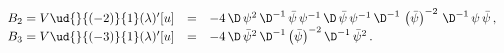 \begin{equation*}
\begin{array}{rcl}
B_2 = V\ud{}{(-2)}{1}(\lambda)'[u]& = & -4\,\D\,\psi^2\,\D^{-1}\,{\bar{\psi}}\,{\psi}^{-1}\,\D\,{\bar{\psi}}\,{\psi}^{-1}\,\D^{-1}\,\left(\bar{{\psi}}\right)^{-2}\,\D^{-1}\,\psi\,\bar{\psi}\,, \\
B_3 = V\ud{}{(-3)}{1}(\lambda)'[u]& = &
-4\,\D\,\bar{\psi}^2\,\D^{-1}\,{\left(\bar{\psi}\right)^{-2}}\,\D^{-1}\,\bar{\psi}^2\,.\
\end{array}
\end{equation*}

